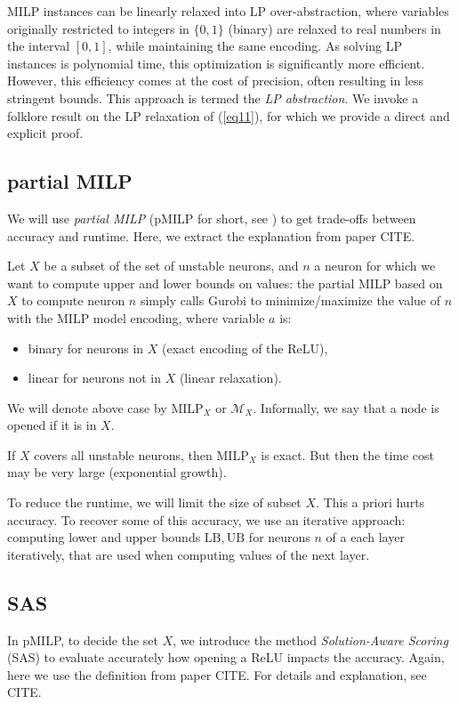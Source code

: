 \documentclass[letterpaper]{article} %
\newcommand{\UB}{\mathrm{UB}}
\newcommand{\LB}{\mathrm{LB}}
\begin{document}
	MILP instances can be linearly relaxed into LP over-abstraction, where variables originally restricted to integers in $\{0,1\}$ (binary) are relaxed to real numbers in the interval $[0,1]$, while maintaining the same encoding. As solving LP instances is polynomial time, this optimization is significantly more efficient. However, this efficiency comes at the cost of precision, often resulting in less stringent bounds. This approach is termed the {\em LP abstraction}. We invoke a folklore result on the LP relaxation of (\ref{eq11}), for which we provide a direct and explicit proof.
	
	
	\subsection{partial MILP}
	
	We will use {\em partial MILP} (pMILP for short, see \cite{DivideAndSlide}) to get trade-offs between accuracy and runtime. Here, we extract the explanation from paper CITE.
	
	
	Let $X$ be a subset of the set of unstable neurons, and $n$ a neuron for which we want to compute upper and lower bounds on values: the partial MILP based on $X$ to compute neuron $n$ simply calls Gurobi to minimize/maximize the value of $n$ with the MILP model encoding, where variable $a$ is:
	\begin{itemize}
		\item binary for neurons in $X$ (exact encoding of the ReLU),
		\item linear for neurons not in $X$ (linear relaxation).
	\end{itemize}
	We will denote above case by MILP$_X$ or $\mathcal{M}_X$. Informally, we say that a node is opened if it is in $X$. 
	
	If $X$ covers all unstable neurons, then MILP$_X$ is exact. But then the time cost may be very large (exponential growth).
	
	
	To reduce the runtime, we will limit the size of subset $X$. This a priori hurts accuracy. To recover some of this accuracy, we use an iterative approach: computing lower and upper bounds $\LB,\UB$ for neurons $n$ of a each layer iteratively, that are used when computing values of the next layer.
	
	
	\subsection{SAS}
	
	
	In pMILP, to decide the set $X$, we introduce the method {\em Solution-Aware Scoring} (SAS)
	to evaluate accurately how opening a ReLU impacts the accuracy. Again, here we use the definition from paper CITE. For details and explanation, see CITE.
	
\end{document}
